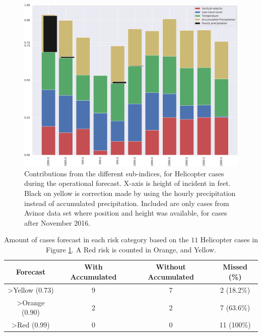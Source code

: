 \begin{figure}
    \centering
    \includegraphics[width=\textwidth]{Figures/HeliAccum.pdf}
    \caption{Contributions from the different sub-indices, for Helicopter cases during the operational forecast. X-axis is height of incident in feet. Black on yellow is correction made by using the hourly precipitation instead of accumulated precipitation. Included are only cases from Avinor data set where position and height was available, for cases after November 2016.}
    \label{fig:HeliAccum}
\end{figure}

\begin{table}
    \centering
    \begin{tabular}{c|c|c|c}
        Forecast & With Accumulated & Without Accumulated & Missed (\%) \\ \hline
        >Yellow (0.73) & 9 & 7 & 2 (18.2\%)\\
        >Orange (0.90) & 2 & 2 & 7 (63.6\%)\\ 
        >Red (0.99) & 0 & 0 & 11 (100\%)\\
    \end{tabular}
    \caption{Amount of cases forecast in each risk category based on the $11$ Helicopter cases in Figure \ref{fig:HeliAccum}. A Red risk is counted in Orange, and Yellow.}
    \label{tab:HeliCont}
\end{table}

